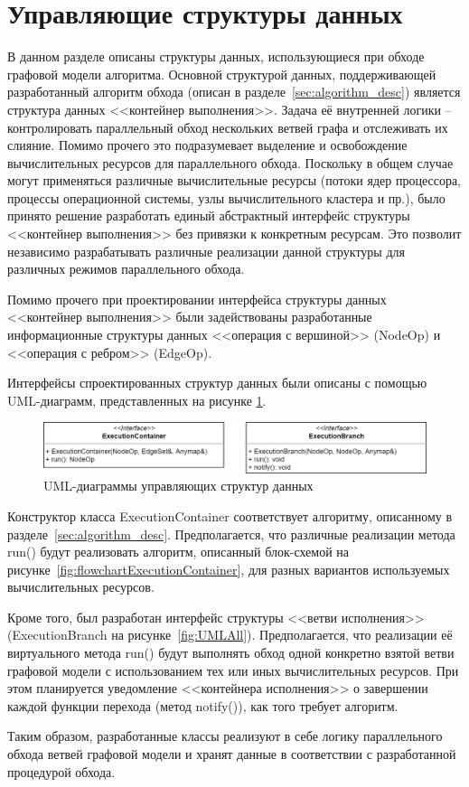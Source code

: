 \section{Управляющие структуры данных}\label{sec:execution_structures}
В данном разделе описаны структуры данных, использующиеся при обходе графовой модели алгоритма. Основной структурой данных, поддерживающей разработанный алгоритм обхода (описан в разделе~\ref{sec:algorithm_desc}) является структура данных <<контейнер выполнения>>. Задача её внутренней логики -- контролировать параллельный обход нескольких ветвей графа и отслеживать их слияние. Помимо прочего это подразумевает выделение и освобождение вычислительных ресурсов для параллельного обхода. Поскольку в общем случае могут применяться различные вычислительные ресурсы (потоки ядер процессора, процессы операционной системы, узлы вычислительного кластера и пр.), было принято решение разработать единый абстрактный интерфейс структуры <<контейнер выполнения>> без привязки к конкретным ресурсам. Это позволит независимо разрабатывать различные реализации данной структуры для различных режимов параллельного обхода.

Помимо прочего при проектировании интерфейса структуры данных <<контейнер выполнения>> были задействованы разработанные информационные структуры данных <<операция с вершиной>> (\textsf{NodeOp}) и <<операция с ребром>> (\textsf{EdgeOp}).

Интерфейсы спроектированных структур данных были описаны с помощью UML-диаграмм, представленных на рисунке \ref{fig:UMLExecution}.
\begin{figure}[!ht]
    \centering
    \includegraphics[width=\textwidth]{figures/UML.all.png}
    \caption{UML-диаграммы управляющих структур данных}
    \label{fig:UMLExecution}
\end{figure}

Конструктор класса \textsf{ExecutionContainer} соответствует алгоритму, описанному в разделе~\ref{sec:algorithm_desc}. Предполагается, что различные реализации метода \textsf{run()} будут реализовать алгоритм, описанный блок-схемой на рисунке~\ref{fig:flowchartExecutionContainer}, для разных вариантов используемых вычислительных ресурсов.

Кроме того, был разработан интерфейс структуры <<ветви исполнения>> (\textsf{ExecutionBranch} на рисунке~\ref{fig:UMLAll}). Предполагается, что реализации её виртуального метода \textsf{run()} будут выполнять обход одной конкретно взятой ветви графовой модели с использованием тех или иных вычислительных ресурсов. При этом планируется уведомление <<контейнера исполнения>> о завершении каждой функции перехода (метод \textsf{notify()}), как того требует алгоритм.

Таким образом, разработанные классы реализуют в себе логику параллельного обхода ветвей графовой модели и хранят данные в соответствии с разработанной процедурой обхода.